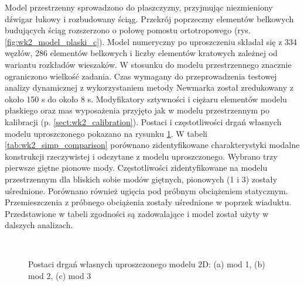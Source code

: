 Model przestrzenny sprowadzono do płaszczyzny, przyjmując niezmieniony dźwigar łukowy i rozbudowany ściąg. Przekrój poprzeczny elementów belkowych budujących ściąg rozszerzono o połowę pomostu ortotropowego (rys. \ref{fig:wk2_model_plaski_c}). Model numeryczny po uproszczeniu składał się z 334 węzłów, 286 elementów belkowych i liczby elementów kratowych zależnej od wariantu rozkładów wieszaków. W stosunku do modelu przestrzennego znacznie ograniczono wielkość zadania. Czas wymagany do przeprowadzenia testowej analizy dynamicznej z wykorzystaniem metody Newmarka został zredukowany z około 150 s do około 8 s. Modyfikatory sztywności i ciężaru elementów modelu płaskiego oraz mas wyposażenia przyjęto jak w modelu przestrzennym po kalibracji (p. \ref{sect:wk2_calibration}). Postaci i częstotliwości drgań własnych modelu uproszczonego pokazano na rysunku \ref{fig:wk2_upr_mods}. W tabeli \ref{tab:wk2_simp_comparison} porównano zidentyfikowane charakterystyki modalne konstrukcji rzeczywistej i odczytane z modelu uproszczonego. Wybrano trzy pierwsze giętne pionowe mody. Częstotliwości zidentyfikowane na modelu przestrzennym dla bliskich sobie modów giętnych, pionowych (1 i 3) zostały uśrednione. Porównano również ugięcia pod próbnym obciążeniem statycznym. Przemieszczenia z próbnego obciążenia zostały uśrednione w poprzek wiaduktu.
Przedstawione w tabeli zgodności są zadowalające i model został użyty w dalszych analizach.





\begin{figure}[hbt!]
	\centering
	\\
	\captionsetup{justification=centering}
	\caption{Postaci drgań własnych uproszczonego modelu 2D: (a) mod 1, (b) mod 2, (c) mod 3}
	\label{fig:wk2_upr_mods}
\end{figure}


